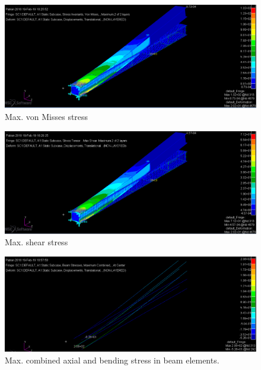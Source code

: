 \documentclass[11pt,a4paper,oneside]{memoir}
\begin{document}
\begin{figure}[h]
    \centering
    \includegraphics[width = .8\textwidth]{figures/one-von-misses.png}
    \caption{Max. von Misses stress}
    \label{fig:max-von-mosses}
\end{figure}
\begin{figure}[h]
    \centering
    \includegraphics[width = .8\textwidth]{figures/one-max-shear.png}
    \caption{Max. shear stress}
    \label{fig:max-shear}
\end{figure}
\begin{figure}[h]
    \centering
    \includegraphics[width = .8\textwidth]{figures/one-combined-beam-stress.png}
    \caption{Max. combined axial and bending stress in beam elements.}
    \label{fig:combined-beam}
\end{figure}
\end{document}
